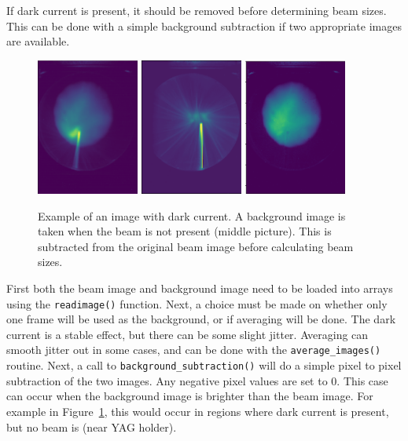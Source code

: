 If dark current is present, it should be removed before determining beam sizes.
This can be done with a simple background subtraction if two appropriate images are available.
\begin{figure}
	\centering
	\includegraphics[width=0.3\textwidth]{images/darkcurrent}
	\includegraphics[width=0.3\textwidth]{images/backgroundonly}
	\includegraphics[width=0.3\textwidth]{images/background_cutout}%
	\caption{Example of an image with dark current. A background image is taken 
	when the beam is not present (middle picture). This is subtracted from the original beam image
	before calculating beam sizes.}
	\label{fig:backgroundsubtraction}
\end{figure}
First both the beam image and background image need to be loaded into 
arrays using the \verb|readimage()| function.
Next, a choice must be made on whether only one frame will be used 
as the background, or if averaging will be done. 
The dark current is a stable effect, but there can be some slight jitter.
Averaging can smooth jitter out in some cases, and can be done with 
the \verb|average_images()| routine. 
Next, a call to \verb|background_subtraction()| will do a simple pixel to 
pixel subtraction of the two images. Any negative pixel values are set to 0.
This case can occur when the background image is brighter than the beam image. 
For example in Figure~\ref{fig:backgroundsubtraction}, this would occur in regions 
where dark current is present, but no beam is (near YAG holder). 


